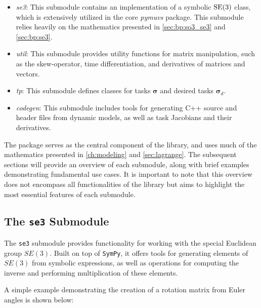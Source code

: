 \begin{itemize}
    \item \emph{se3}: This submodule contains an implementation of a symbolic $\operatorname{SE}(3)$ 
        class, which is extensively utilized in the core \emph{pymuvs} package.
        This submodule relies heavily on the mathematics presented in
        \autoref{sec:bp:so3_se3} and \autoref{sec:bp:se3}.

    
    \item \emph{util}: This submodule provides utility functions for matrix 
        manipulation, such as the skew-operator, time differentiation, and derivatives 
        of matrices and vectors.
    
    \item \emph{tp}: This submodule defines classes for tasks $\bm{\sigma}$ and 
        desired tasks $\bm{\sigma}_d$.
    
    \item \emph{codegen}: This submodule includes tools for generating C++ source 
        and header files from dynamic models, as well as task Jacobians and their derivatives.
\end{itemize}

The \pymuvs{} package serves as the central component of the library, and uses
much of the mathematics presented in \autoref{ch:modeling} and \autoref{sec:lagrange}.
The  subsequent sections will provide an overview of each submodule, along with 
brief examples demonstrating fundamental use cases. It is important to note 
that this overview does not encompass all functionalities of the library but 
aims to highlight the most essential features of each submodule.



\subsection{The \texttt{se3} Submodule}

The \texttt{se3} submodule provides functionality for working with the special Euclidean group $SE(3)$. Built on top of \texttt{SymPy}, it offers tools for generating elements of $SE(3)$ from symbolic expressions, as well as operations for computing the inverse and performing multiplication of these elements.

A simple example demonstrating the creation of a rotation matrix from Euler angles is shown below:

